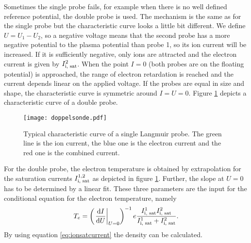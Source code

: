 Sometimes the single probe fails, for example when there is no well defined reference potential, the double probe is used. The mechanism is the same as for the single probe but the characteristic curve looks a little bit different. We define $U=U_1 - U_2$, so a negative voltage means that the second probe has a more negative potential to the plasma potential than probe 1, so its ion current will be increased. If it is sufficiently negative, only ions are attracted and the electron current is given by $I_{\text{\scriptsize i, sat}}^2$. When the point $I=0$ (both probes are on the floating potential) is approached, the range of electron retardation is reached and the current depends linear on the applied voltage. If the probes are equal in size and shape, the characteristic curve is symmetric around $I=U=0$. Figure \ref{fig:doubleprobe} depicts a characteristic curve of a double probe.
\begin{figure}[tb]
	\centering
	\texttt{[image: doppelsonde.pdf]}
	\caption{\label{fig:doubleprobe}Typical characteristic curve of a single Langmuir probe. The green line is the ion current, the blue one is the electron current and the red one is the combined current.}
\end{figure}
For the double probe, the electron temperature is obtained by extrapolation for the saturation currents $I_{\text{\scriptsize i, sat}}^{1,2}$ as depicted in figure \ref{fig:doubleprobe}. Further, the slope at $U=0$ has to be determined by a linear fit. These three parameters are the input for the conditional equation for the electron temperature, namely
\begin{align}
	\label{eq:doubleprobeelectrontemp}
	T_e = \left( \left. \frac{\text{d} I}{\text{d} U} \right|_{U=0} \right)^{-1} e \frac{I_{\text{\scriptsize i, sat}}^1 I_{\text{\scriptsize i, sat}}^2}{I_{\text{\scriptsize i, sat}}^1 + I_{\text{\scriptsize i, sat}}^2} \scriptsize{.}
\end{align}
By using equation \eqref{eq:ionsatcurrent} the density can be calculated.
